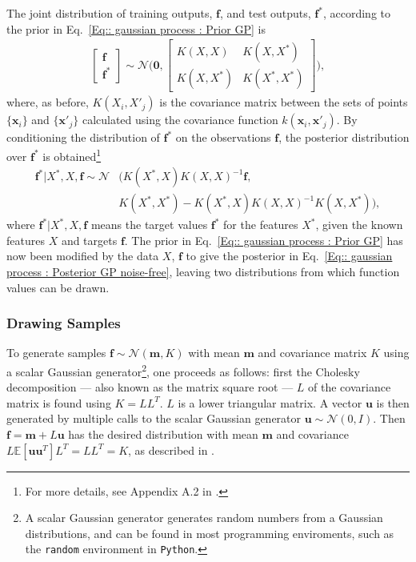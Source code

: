 \documentclass[twoside,english]{uiofysmaster}
\begin{document}
{The joint distribution of training outputs, $\textbf{f}$, and test outputs, $\textbf{f}^*$, according to the prior in Eq.~\ref{Eq:: gaussian process : Prior GP} is
\begin{align}
\begin{bmatrix}
\textbf{f}\\
\textbf{f}^*
\end{bmatrix}
\sim 
\mathcal{N} \Bigg(
\boldsymbol{0},
\begin{bmatrix}
K(X, X) & K(X, X^*)\\
K(X, X^*) & K(X^*, X^*)
\end{bmatrix}
 \Bigg),
\end{align}
where, as before, $K(X_i, X'_j)$ is the covariance matrix between the sets of points $\{ \textbf{x}_i \}$ and $\{\textbf{x}'_j \}$ calculated using the covariance function $k(\textbf{x}_i, \textbf{x}'_j)$. By conditioning the distribution of $\textbf{f}^*$ on the observations $\textbf{f}$,  the posterior distribution over $\textbf{f}^*$ is obtained\footnote{For more details, see Appendix A.2 in \cite{rasmussen2006gaussian}.}  \cite{rasmussen2006gaussian} 
\begin{align}\label{Eq:: gaussian process : Posterior GP noise-free}
\textbf{f}^* \big| X^*, X, \textbf{f} \sim \mathcal{N}&(K(X^*, X)K(X, X)^{-1} \textbf{f},\\ &K(X^*, X^*) - K(X^*, X)K(X, X)^{-1}K(X, X^*)),
\end{align}
where $\textbf{f}^* | X^*, X, \textbf{f}$ means the target values $\textbf{f}^*$ for the features $X^*$, given the known features $X$ and targets $\textbf{f}$. The prior in Eq.~\ref{Eq:: gaussian process : Prior GP} has now been modified by the data $X$, $\textbf{f}$ to give the posterior in Eq.~\ref{Eq:: gaussian process : Posterior GP noise-free}, leaving two distributions from which function values can be drawn.


\subsubsection{Drawing Samples}

To generate samples $\textbf{f} \sim \mathcal{N}(\textbf{m}, K)$ with mean $\textbf{m}$ and covariance matrix $K$ using a scalar Gaussian generator\footnote{A scalar Gaussian generator generates random numbers from a Gaussian distributions, and can be found in most programming enviroments, such as the \verb|random| environment in \verb|Python|.}, one proceeds as follows: first the Cholesky decomposition --- also known as the matrix square root ---  $L$ of the covariance matrix is found using $K = LL^T$. $L$ is a lower triangular matrix. A vector $\textbf{u}$ is then generated by multiple calls to the scalar Gaussian generator $\textbf{u} \sim \mathcal{N}(0, I)$. Then $\textbf{f} = \textbf{m} + L \textbf{u}$ has the desired distribution with mean $\textbf{m}$ and covariance $L \mathbb{E} [\textbf{u} \textbf{u}^T]L^T = LL^T = K$, as described in \cite{rasmussen2006gaussian}.

}
\end{document}
